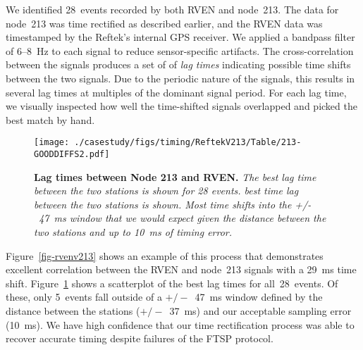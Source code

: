 We identified 28~events recorded by both RVEN and node~213.  The data for
node~213 was time rectified as described earlier, and the RVEN data was
timestamped by the Reftek's internal GPS receiver.  We applied a bandpass
filter of 6--8~Hz to each signal to reduce sensor-specific artifacts. The
cross-correlation between the signals produces a set of
of {\em lag times} indicating possible time shifts between the two signals.
Due to the periodic nature of the signals, this results in
several lag times at multiples of the dominant signal period. For each lag
time, we visually inspected how well the time-shifted signals overlapped and
picked the best match by hand.


\begin{figure}[t]
\begin{center}
\texttt{[image: ./casestudy/figs/timing/ReftekV213/Table/213-GOODDIFFS2.pdf]}
\end{center}
\caption{\small{\bf Lag times between Node 213 and RVEN.}
{\em The best lag time between the two stations is shown for 28 events.  best
time lag between the two stations is shown.  Most time shifts into the
+/-~47~ms window that we would expect given the distance between the two
stations and up to 10~ms of timing error.}}
\label{fig-rvenv213all}
\end{figure}

Figure~\ref{fig-rvenv213} shows an example of this process that demonstrates
excellent correlation between the RVEN and node~213 signals with a 29~ms time
shift. Figure~\ref{fig-rvenv213all} shows a scatterplot of the best lag times
for all~28~events.  Of these, only 5~events fall outside of a $+/-$~47~ms
window defined by the distance between the stations ($+/-$~37~ms) and our
acceptable sampling error (10~ms). We have high confidence that our
time rectification process was able to recover accurate timing despite
failures of the FTSP protocol.


